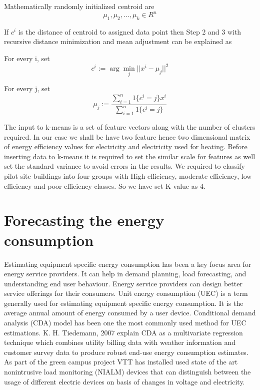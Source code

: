 Mathematically randomly initialized centroid are  
$${\mu_1,\mu_2,\dotsc,\mu_k}  \in R^{n}$$


If \(c^{i}\) is the distance of centroid to assigned data point then Step 2 and 3 with recursive distance minimization and mean adjustment can be explained as 

For every i, set 
\begin{equation}
c^{i} := \arg\min_j || x^{i} - \mu_j||^2
\end{equation}  

For every j, set
\begin{equation}
\mu_{j} := \frac{\sum\limits_{i=1}^n 1\{c^{i} =j\}x^{i}}{\sum\limits_{i=1}^n 1\{c^{i}=j\}}
\end{equation}

The input to k-means is a set of feature vectors along with the number of clusters required. In our case we shall be have two feature hence two dimensional matrix of energy efficiency values for electricity and electricity used for heating. Before inserting data to k-means it is required to set the similar scale for features as well set the standard variance to avoid errors in the results. We required to classify pilot site buildings into four groups with High efficiency, moderate efficiency, low efficiency and poor efficiency classes. So we have set K value as 4.

\section{Forecasting the energy consumption}
Estimating equipment specific energy consumption has been a key focus area for energy service providers. It can help in demand planning, load forecasting, and understanding end user behaviour.  Energy service providers can design better service offerings for their consumers. Unit energy consumption (UEC) is a term generally used for estimating equipment specific energy consumption. It is the average annual amount of energy consumed by a user device. Conditional demand analysis (CDA) model has been one the most commonly used method for UEC estimations. K. H. Tiedemann, 2007 explain CDA as a multivariate regression technique which combines utility billing data with weather information and customer survey data to produce robust end-use energy consumption estimates\cite{tiedemann2007using}. As part of the green campus project VTT has installed used state of the art nonintrusive load monitoring (NIALM)\cite{hart1992nonintrusive} devices that can distinguish between the usage of different electric devices on basis of changes in voltage and electricity. 

